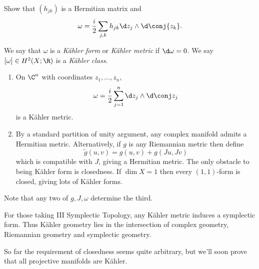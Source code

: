 \documentclass[a4paper]{article}
\newcommand{\w}{\wedge} %
\begin{document}
\begin{ex}
  Show that \((h_{jk})\) is a Hermitian matrix and
  \[
    \omega = \frac{i}{2} \sum_{j, k} h_{jk} \d z_j \w \d \conj{z_k}.
  \]
\end{ex}

\begin{definition}
  We say that \(\omega\) is a \emph{Kähler form} or \emph{Kähler metric} if \(\d \omega = 0\). We say \([\omega] \in H^2(X; \R)\) is a \emph{Kähler class}.
\end{definition}

\begin{eg}\leavevmode
  \begin{enumerate}
  \item On \(\C^n\) with coordinates \(z_1, \dots, z_n\),
    \[
      \omega = \frac{i}{2} \sum_{j = 1}^n \d z_j \w \d \conj z_j
    \]
    is a Kähler metric.
  \item By a standard partition of unity argument, any complex manifold admits a Hermitian metric. Alternatively, if \(g\) is any Riemannian metric then define
    \[
      \tilde g(u, v) = g(u, v) + g(Ju, Jv)
    \]
    which is compatible with \(J\), giving a Hermitian metric. The only obstacle to being Kähler form is closedness. If \(\dim X = 1\) then every \((1, 1)\)-form is closed, giving lots of Kähler forms.
  \end{enumerate}
\end{eg}

Note that any two of \(g, J, \omega\) determine the third.

\begin{remark}
  For those taking III Symplectic Topology, any Kähler metric induces a symplectic form. Thus Kähler geometry lies in the intersection of complex geometry, Riemannian geometry and symplectic geometry.
\end{remark}

So far the requirement of closedness seems quite arbitrary, but we'll soon prove that all projective manifolds are Kähler.
\end{document}
